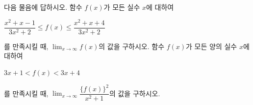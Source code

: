다음 물음에 답하시오.
 함수 $f(x)$가 모든 실수 $x$에 대하여 \par\smallskip\centerline{$\dfrac{x^2+x-1}{3x^2+2}\le f(x)\le\dfrac{x^2+x+4}{3x^2+2}$}\par\smallskip\noindent 를 만족시킬 때, $\displaystyle\lim_{x\to\infty}f(x)$의 값을 구하시오.
 함수 $f(x)$가 모든 양의 실수 $x$에 대하여 \par\smallskip\centerline{$3x+1<f(x)<3x+4$}\par\smallskip\noindent 를 만족시킬 때, $\displaystyle\lim_{x\to\infty}\dfrac{\{f(x)\}^2}{x^2+1}$의 값을 구하시오.
